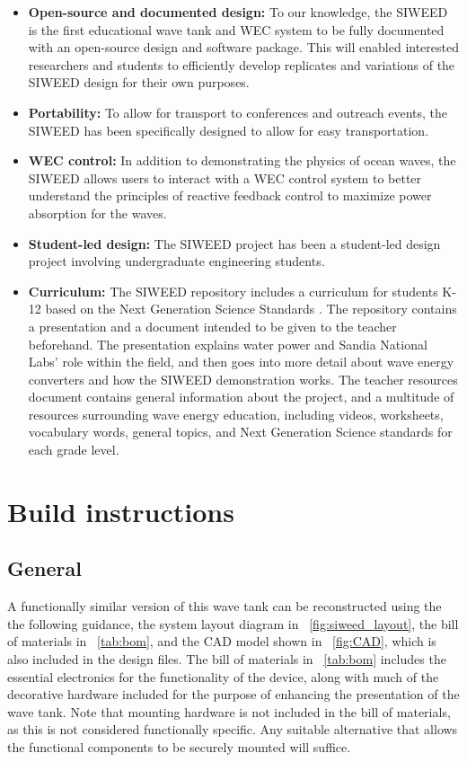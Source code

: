 \documentclass[hardware,article,submit,pdftex,moreauthors]{Definitions/mdpi}
\begin{document}
\begin{itemize}
  \item \textbf{Open-source and documented design:} To our knowledge, the SIWEED is the first educational wave tank and WEC system to be fully documented with an open-source design and software package.
  This will enabled interested researchers and students to efficiently develop replicates and variations of the SIWEED design for their own purposes.
  \item \textbf{Portability:} To allow for transport to conferences and outreach events, the SIWEED has been specifically designed to allow for easy transportation.
  \item \textbf{WEC control:} In addition to demonstrating the physics of ocean waves, the SIWEED allows users to interact with a WEC control system to better understand the principles of reactive feedback control to maximize power absorption for the waves.
  \item \textbf{Student-led design:} The SIWEED project has been a student-led design project involving undergraduate engineering students.
  \item \textbf{Curriculum:} The SIWEED repository includes a curriculum for students K-12 based on the Next Generation Science Standards \cite{NextGenScience2021}. 
  The repository contains a presentation and a document intended to be given to the teacher beforehand. 
  The presentation explains water power and Sandia National Labs' role within the field, and then goes into more detail about wave energy converters and how the SIWEED demonstration works.
  The teacher resources document contains general information about the project, and a multitude of resources surrounding wave energy education, including videos, worksheets, vocabulary words, general topics, and Next Generation Science standards for each grade level.
\end{itemize}

\section{Build instructions}

\subsection{General}
A functionally similar version of this wave tank can be reconstructed using the the following guidance, the system layout diagram in \figurename~\ref{fig:siweed_layout}, the bill of materials in \tablename~\ref{tab:bom}, and the CAD model shown in \figurename~\ref{fig:CAD}, which is also included in the design files.
The bill of materials in \tablename~\ref{tab:bom} includes the essential electronics for the functionality of the device, along with much of the decorative hardware included for the purpose of enhancing the presentation of the wave tank.
Note that mounting hardware is not included in the bill of materials, as this is not considered functionally specific. 
Any suitable alternative that allows the functional components to be securely mounted will suffice.
\end{document}
